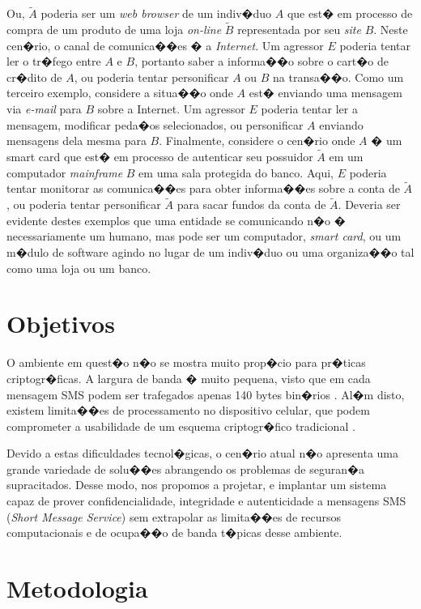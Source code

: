 \documentclass[a4paper,capchap,espacoduplo,normaltoc]{abntepusp}
\begin{document}
Ou, $\tilde{A}$ poderia ser um \emph{web browser} de um indiv�duo $A$ que est� em processo de compra de um produto de uma loja \emph{on-line} $\tilde{B}$ representada por seu \emph{site} $B$. Neste cen�rio, o canal de comunica��es � a \emph{Internet}. Um agressor $E$ poderia tentar ler o tr�fego entre $A$ e $B$, portanto saber a informa��o sobre o cart�o de cr�dito de $A$, ou poderia tentar personificar $A$ ou $B$ na transa��o. 
Como um terceiro exemplo, considere a situa��o onde $A$ est� enviando uma mensagem via \emph{e-mail} para $B$ sobre a Internet. Um agressor $E$ poderia tentar ler a mensagem, modificar peda�os selecionados, ou personificar $A$ enviando mensagens dela mesma para $B$. Finalmente, considere o cen�rio onde $A$ � um smart card que est� em processo de autenticar seu possuidor $\tilde{A}$ em um computador \emph{mainframe} $B$ em uma sala protegida do banco. Aqui, $E$ poderia tentar monitorar as comunica��es para obter informa��es sobre a conta de $\tilde{A}$ , ou poderia tentar personificar $\tilde{A}$ para sacar fundos da conta de $\tilde{A}$. Deveria ser evidente destes exemplos que uma entidade se comunicando n�o � necessariamente um humano, mas pode ser um computador, \emph{smart card}, ou um m�dulo de software agindo no lugar de um indiv�duo ou uma organiza��o tal como uma loja ou um banco.\cite{menezes}

\section{Objetivos}

O ambiente em quest�o n�o se mostra muito prop�cio para pr�ticas criptogr�ficas. A largura de banda � muito pequena, visto que em cada mensagem SMS podem ser trafegados apenas 140 bytes bin�rios \cite{ortiz}.
Al�m disto, existem limita��es de processamento no dispositivo celular, que podem comprometer a usabilidade de um esquema criptogr�fico tradicional \cite{loon}.

Devido a estas dificuldades tecnol�gicas, o cen�rio atual n�o apresenta uma grande variedade de solu��es abrangendo os problemas de seguran�a supracitados. Desse modo, nos propomos a projetar, e implantar um sistema capaz de prover confidencialidade, integridade e autenticidade a mensagens SMS (\emph{Short Message Service}) sem extrapolar as limita��es de recursos computacionais e de ocupa��o de banda t�picas desse ambiente.

\section{Metodologia}
\end{document}
